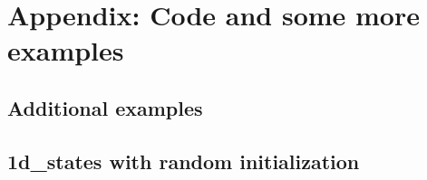 \documentclass[12pt,a4paper]{article}
\begin{document}
\newpage


\section{Appendix: Code and some more examples}
\vspace{1cm}


\subsection{Additional examples}
\vspace{0.1cm}

\subsection*{\small 1d\_states with random initialization}
\end{document}
